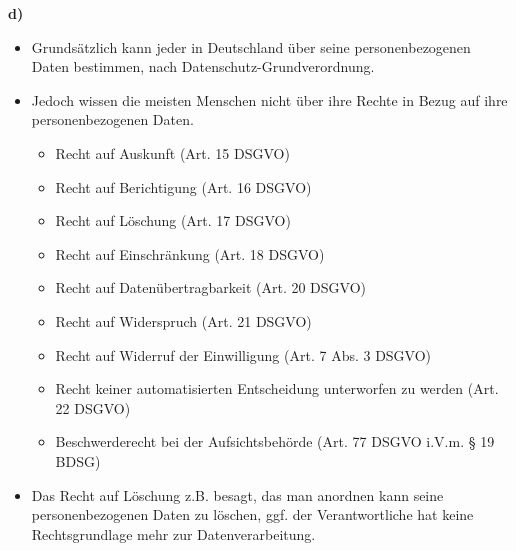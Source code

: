 \documentclass[a4paper]{assignment}
\begin{document}
\begin{problemlist}
\begin{problem}
\begin{answer}
				\textbf{d)}
				\begin{itemize}
					\item Grundsätzlich kann jeder in Deutschland über seine personenbezogenen Daten bestimmen, nach Datenschutz-Grundverordnung.\cite{wiki-selbstbestimmung}
					\item Jedoch wissen die meisten Menschen nicht über ihre Rechte in Bezug auf ihre personenbezogenen Daten.\cite{dsgvo-rechte}
					\begin{itemize}
						\item Recht auf Auskunft (Art. 15 DSGVO)
						\item Recht auf Berichtigung (Art. 16 DSGVO)
    						\item Recht auf Löschung (Art. 17 DSGVO)
    						\item Recht auf Einschränkung (Art. 18 DSGVO)
    						\item Recht auf Datenübertragbarkeit (Art. 20 DSGVO)
    						\item Recht auf Widerspruch (Art. 21 DSGVO)
    						\item Recht auf Widerruf der Einwilligung (Art. 7 Abs. 3 DSGVO)
    						\item Recht keiner automatisierten Entscheidung unterworfen zu werden (Art. 22 DSGVO)
    						\item Beschwerderecht bei der Aufsichtsbehörde (Art. 77 DSGVO i.V.m. § 19 BDSG)
					\end{itemize}
					\item Das Recht auf Löschung z.B. besagt, das man anordnen kann seine personenbezogenen Daten zu löschen, ggf. der Verantwortliche hat keine Rechtsgrundlage mehr zur Datenverarbeitung.\cite{dsgvo-löschung}
				\end{itemize}				
				
			\end{answer}
		\end{problem}
		
	\end{problemlist}
\printbibliography
\end{document}
